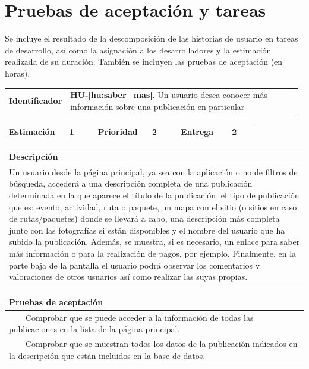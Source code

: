 \documentclass[11pt]{article}
\newcommand{\tabitem}{~~\llap{\textbullet}~~}
\begin{document}
\section{Pruebas de aceptación y tareas}
Se incluye el resultado de la descomposición de las historias de usuario en tareas de desarrollo, así como la asignación a los desarrolladores y la estimación realizada de su duración. También se incluyen las pruebas de aceptación (en horas).


\begin{longtable}{p{0.18\linewidth}|p{0.8\linewidth}}
  \rowcolor{LightCyan}
  \textbf{Identificador} & \textbf{HU-\ref{hu:saber_mas}}. Un usuario desea conocer más información sobre una publicación en particular\\  
\end{longtable}
\vspace{-0.8cm}
\begin{longtable}{p{0.18\linewidth}|p{0.1\linewidth}|p{0.18\linewidth}|p{0.1\linewidth}|p{0.18\linewidth}|p{0.1\linewidth}}
  \toprule
  \textbf{Estimación} & 1 & \textbf{Prioridad} & 2 & \textbf{Entrega} & 2 \\
  \bottomrule
\end{longtable}
\vspace{-0.8cm}
\begin{longtable}{p{1.028\linewidth}}
  \textbf{Descripción}\\
  \midrule
  Un usuario desde la página principal, ya sea con la aplicación o no de filtros de búsqueda, accederá a una descripción completa de una publicación determinada en la que aparece el título de la publicación, el tipo de publicación que es: evento, actividad, ruta o paquete, un mapa con el sitio (o sitios en caso de rutas/paquetes) donde se llevará a cabo, una descripción más completa junto con las fotografías si están disponibles y el nombre del usuario que ha subido la publicación. Además, se muestra, si es necesario, un enlace para saber más información o para la realización de pagos, por ejemplo.
  Finalmente, en la parte baja de la pantalla el usuario podrá observar los comentarios y valoraciones de otros usuarios así como realizar las suyas propias.
  \\
  \bottomrule
\end{longtable}
\vspace{-0.8cm}
\begin{longtable}{p{1.028\linewidth}}
  \textbf{Pruebas de aceptación}\\
  \midrule
  \tabitem Comprobar que se puede acceder a la información de todas las publicaciones en la lista de la página principal.\\
  \tabitem Comprobar que se muestran todos los datos de la publicación indicados en la descripción que están incluidos en la base de datos.\\
\end{longtable}
\end{document}
